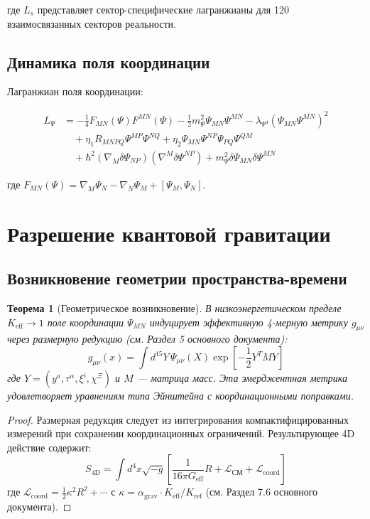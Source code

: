 \documentclass[12pt,a4paper]{article}
\newcommand{\eff}{\text{eff}}
\newcommand{\coord}{\text{coord}}
\newtheorem{theorem}{Теорема}[section]
\theoremstyle{remark}
\newcommand{\Keff}{K_{\mathrm{eff}}}
\begin{document}
	где $L_s$ представляет сектор-специфические лагранжианы для 120 взаимосвязанных секторов реальности.
	
	\subsection{Динамика поля координации}
	
	Лагранжиан поля координации:
	
	\begin{equation}
		\begin{aligned}
			L_{\Psi} &= -\frac{1}{4} F_{MN}(\Psi) F^{MN}(\Psi)
			- \frac{1}{2} m_{\Psi}^2 \Psi_{MN} \Psi^{MN}
			- \lambda_{\Psi^4} (\Psi_{MN}\Psi^{MN})^2 \\
			&\quad + \eta_1 R_{MNPQ} \Psi^{MP} \Psi^{NQ}
			+ \eta_2 \Psi_{MN}\Psi^{NP}\Psi_{PQ}\Psi^{QM} \\
			&\quad + \hbar^2 (\nabla_M \delta\Psi_{NP})(\nabla^M \delta\Psi^{NP})
			+ m_{\Psi}^2 \delta\Psi_{MN}\delta\Psi^{MN}
		\end{aligned}
	\end{equation}
	
	где $F_{MN}(\Psi) = \nabla_M \Psi_N - \nabla_N \Psi_M + [\Psi_M, \Psi_N]$.
	
	\section{Разрешение квантовой гравитации}
	\label{sec:quantum-gravity-resolution}
	
	\subsection{Возникновение геометрии пространства-времени}
	
	\begin{theorem}[Геометрическое возникновение]
		В низкоэнергетическом пределе $\Keff \to 1$ поле координации $\Psi_{MN}$ индуцирует эффективную 4-мерную метрику $g_{\mu\nu}$ через размерную редукцию (см. Раздел 5 основного документа):
		\[
		g_{\mu\nu}(x) = \int d^{15}Y \, \Psi_{\mu\nu}(X) \exp\left[-\frac{1}{2}Y^T M Y\right]
		\]
		где $Y = (y^a, \tau^\alpha, \xi^i, \chi^\Xi)$ и $M$ — матрица масс. Эта эмерджентная метрика удовлетворяет уравнениям типа Эйнштейна с координационными поправками.
	\end{theorem}
	
	\begin{proof}
		Размерная редукция следует из интегрирования компактифицированных измерений при сохранении координационных ограничений. Результирующее 4D действие содержит:
		\[
		S_{\text{4D}} = \int d^4x \sqrt{-g} \left[ \frac{1}{16\pi G_{\eff}} R + \mathcal{L}_{\text{СМ}} + \mathcal{L}_{\coord} \right]
		\]
		где $\mathcal{L}_{\coord} = \frac{1}{2}\kappa^2 R^2 + \cdots$ с $\kappa = \alpha_{\text{grav}} \cdot \Keff/K_{\text{ref}}$ (см. Раздел 7.6 основного документа).
	\end{proof}
	
\end{document}
